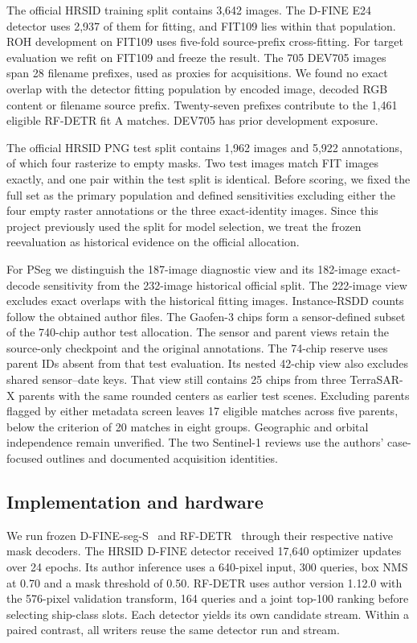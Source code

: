 \documentclass[journal]{IEEEtran}
\begin{document}
The official HRSID training split contains 3,642 images. The D-FINE E24 detector uses 2,937 of them for fitting, and FIT109 lies within that population. ROH development on FIT109 uses five-fold source-prefix cross-fitting. For target evaluation we refit on FIT109 and freeze the result. The 705 DEV705 images span 28 filename prefixes, used as proxies for acquisitions. We found no exact overlap with the detector fitting population by encoded image, decoded RGB content or filename source prefix. Twenty-seven prefixes contribute to the 1,461 eligible RF-DETR fit A matches. DEV705 has prior development exposure.

The official HRSID PNG test split contains 1,962 images and 5,922 annotations, of which four rasterize to empty masks. Two test images match FIT images exactly, and one pair within the test split is identical. Before scoring, we fixed the full set as the primary population and defined sensitivities excluding either the four empty raster annotations or the three exact-identity images. Since this project previously used the split for model selection, we treat the frozen reevaluation as historical evidence on the official allocation.

For PSeg we distinguish the 187-image diagnostic view and its 182-image exact-decode sensitivity from the 232-image historical official split. The 222-image view excludes exact overlaps with the historical fitting images. Instance-RSDD counts follow the obtained author files. The Gaofen-3 chips form a sensor-defined subset of the 740-chip author test allocation. The sensor and parent views retain the source-only checkpoint and the original annotations. The 74-chip reserve uses parent IDs absent from that test evaluation. Its nested 42-chip view also excludes shared sensor--date keys. That view still contains 25 chips from three TerraSAR-X parents with the same rounded centers as earlier test scenes. Excluding parents flagged by either metadata screen leaves 17 eligible matches across five parents, below the criterion of 20 matches in eight groups. Geographic and orbital independence remain unverified. The two Sentinel-1 reviews use the authors' case-focused outlines and documented acquisition identities.

\subsection{Implementation and hardware}

We run frozen D-FINE-seg-S~\cite{dfine} and RF-DETR~\cite{rfdetr} through their respective native mask decoders. The HRSID D-FINE detector received 17,640 optimizer updates over 24 epochs. Its author inference uses a 640-pixel input, 300 queries, box NMS at 0.70 and a mask threshold of 0.50. RF-DETR uses author version 1.12.0 with the 576-pixel validation transform, 164 queries and a joint top-100 ranking before selecting ship-class slots. Each detector yields its own candidate stream. Within a paired contrast, all writers reuse the same detector run and stream.
\end{document}
